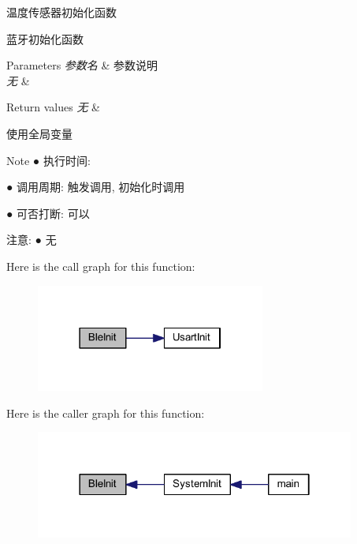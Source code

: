 温度传感器初始化函数 

蓝牙初始化函数


\begin{DoxyParams}{\-Parameters}
{\em 参数名} & 参数说明 \\
\hline
{\em 无} & \\
\hline
\end{DoxyParams}

\begin{DoxyRetVals}{\-Return values}
{\em 无} & \\
\hline
\end{DoxyRetVals}
\begin{DoxyParagraph}{使用全局变量 }

\end{DoxyParagraph}
\begin{DoxyNote}{\-Note}
● 执行时间\-: \par
 ● 调用周期\-: 触发调用, 初始化时调用 \par
 ● 可否打断\-: 可以 \par

\end{DoxyNote}
\begin{DoxyParagraph}{注意\-:}
● 无 \par
 
\end{DoxyParagraph}


\-Here is the call graph for this function\-:\nopagebreak
\begin{figure}[H]
\begin{center}
\leavevmode
\includegraphics[width=214pt]{group___b_l_e_gad65e0136086cff966fcbd14a10a8a313_cgraph}
\end{center}
\end{figure}




\-Here is the caller graph for this function\-:\nopagebreak
\begin{figure}[H]
\begin{center}
\leavevmode
\includegraphics[width=298pt]{group___b_l_e_gad65e0136086cff966fcbd14a10a8a313_icgraph}
\end{center}
\end{figure}


